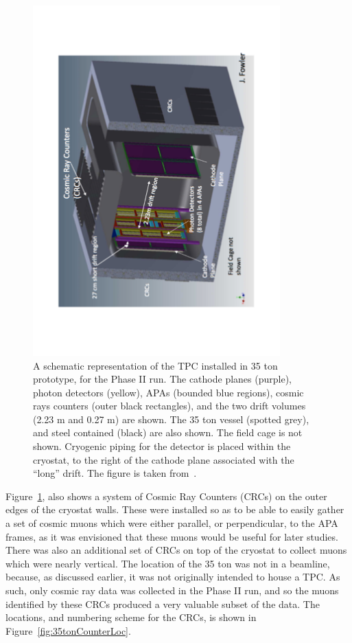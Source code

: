 \begin{figure}
  \centering
  \includegraphics[width=0.85\textwidth]{35tonSchem}
  \caption[A schematic representation of the TPC installed in 35 ton prototype, for the Phase II run]
          {A schematic representation of the TPC installed in 35 ton prototype, for the Phase II run. The cathode planes (purple), photon detectors (yellow), APAs (bounded blue regions), cosmic rays counters (outer black rectangles), and the two drift volumes (2.23 m and 0.27 m) are shown. The 35 ton vessel (spotted grey), and steel contained (black) are also shown. The field cage is not shown. Cryogenic piping for the detector is placed within the cryostat, to the right of the cathode plane associated with the ``long'' drift. The figure is taken from~\citep{DUNECDR_V4}.}
  \label{fig:35tonSchem}
\end{figure}

Figure~\ref{fig:35tonSchem}, also shows a system of Cosmic Ray Counters (CRCs) on the outer edges of the cryostat walls. These were installed so as to be able to easily gather a set of cosmic muons which were either parallel, or perpendicular, to the APA frames, as it was envisioned that these muons would be useful for later studies. There was also an additional set of CRCs on top of the cryostat to collect muons which were nearly vertical. The location of the 35 ton was not in a beamline, because, as discussed earlier, it was not originally intended to house a TPC. As such, only cosmic ray data was collected in the Phase II run, and so the muons identified by these CRCs produced a very valuable subset of the data. The locations, and numbering scheme for the CRCs, is shown in Figure~\ref{fig:35tonCounterLoc}. \\

